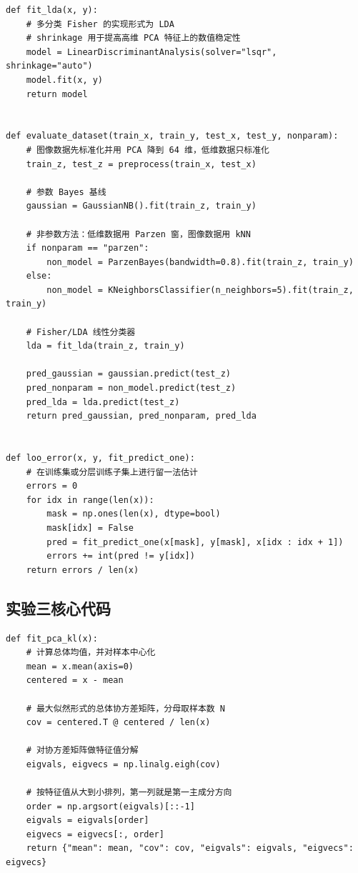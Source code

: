 \documentclass[UTF8,a4paper,12pt]{ctexart}
\begin{document}
\begin{lstlisting}[caption={Exp.2 extended datasets: LDA and non-parametric comparison},label={lst:exp2-extended}]
def fit_lda(x, y):
    # 多分类 Fisher 的实现形式为 LDA
    # shrinkage 用于提高高维 PCA 特征上的数值稳定性
    model = LinearDiscriminantAnalysis(solver="lsqr", shrinkage="auto")
    model.fit(x, y)
    return model


def evaluate_dataset(train_x, train_y, test_x, test_y, nonparam):
    # 图像数据先标准化并用 PCA 降到 64 维，低维数据只标准化
    train_z, test_z = preprocess(train_x, test_x)

    # 参数 Bayes 基线
    gaussian = GaussianNB().fit(train_z, train_y)

    # 非参数方法：低维数据用 Parzen 窗，图像数据用 kNN
    if nonparam == "parzen":
        non_model = ParzenBayes(bandwidth=0.8).fit(train_z, train_y)
    else:
        non_model = KNeighborsClassifier(n_neighbors=5).fit(train_z, train_y)

    # Fisher/LDA 线性分类器
    lda = fit_lda(train_z, train_y)

    pred_gaussian = gaussian.predict(test_z)
    pred_nonparam = non_model.predict(test_z)
    pred_lda = lda.predict(test_z)
    return pred_gaussian, pred_nonparam, pred_lda


def loo_error(x, y, fit_predict_one):
    # 在训练集或分层训练子集上进行留一法估计
    errors = 0
    for idx in range(len(x)):
        mask = np.ones(len(x), dtype=bool)
        mask[idx] = False
        pred = fit_predict_one(x[mask], y[mask], x[idx : idx + 1])
        errors += int(pred != y[idx])
    return errors / len(x)
\end{lstlisting}

\subsection{实验三核心代码}

\begin{lstlisting}[caption={Exp.3 K-L/PCA computation},label={lst:exp3-pca}]
def fit_pca_kl(x):
    # 计算总体均值，并对样本中心化
    mean = x.mean(axis=0)
    centered = x - mean

    # 最大似然形式的总体协方差矩阵，分母取样本数 N
    cov = centered.T @ centered / len(x)

    # 对协方差矩阵做特征值分解
    eigvals, eigvecs = np.linalg.eigh(cov)

    # 按特征值从大到小排列，第一列就是第一主成分方向
    order = np.argsort(eigvals)[::-1]
    eigvals = eigvals[order]
    eigvecs = eigvecs[:, order]
    return {"mean": mean, "cov": cov, "eigvals": eigvals, "eigvecs": eigvecs}
\end{lstlisting}
\end{document}
